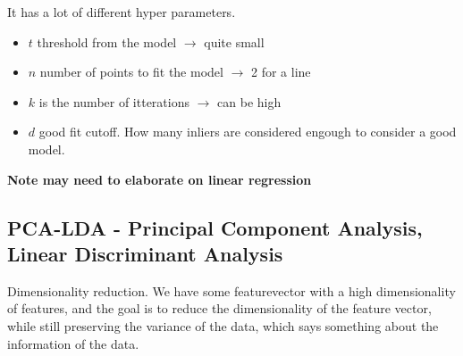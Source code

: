 \documentclass[a4paper]{article}
\begin{document}
It has a lot of different hyper parameters.
\begin{itemize}
	\item $ t $ threshold from the model $ \rightarrow $ quite small
	\item $ n $ number of points to fit the model $ \rightarrow $ 2 for a line 
	\item $ k $ is the number of itterations $ \rightarrow $ can be high
	\item $ d $ good fit cutoff. How many inliers are considered engough to consider a good model.
\end{itemize}

\textbf{Note may need to elaborate on linear regression} 

\newpage
\subsection{PCA-LDA - Principal Component Analysis, Linear Discriminant Analysis}
Dimensionality reduction. We have some featurevector with a high dimensionality of features, and the goal is to reduce the dimensionality of the feature vector, while still preserving the variance of the data, which says something about the information of the data. 
\end{document}
